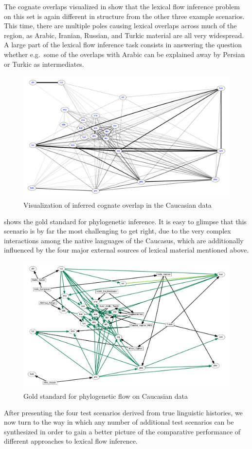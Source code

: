 The cognate overlaps visualized in  show that the lexical flow inference problem on this set is again different in structure from the other three example scenarios. This time, there are multiple poles causing lexical overlaps across much of the region, as Arabic, Iranian, Russian, and Turkic material are all very widespread. A large part of the lexical flow inference task consists in answering the question whether e.g.\ some of the overlaps with Arabic can be explained away by Persian or Turkic as intermediates.

\begin{figure}
 \includegraphics[width=\textwidth]{figures/cognacy-strength-caucasus.pdf}
 \caption{Visualization of inferred cognate overlap in the Caucasian data}
 \label{caucasus-cognacy}
\end{figure}

 shows the gold standard for phylogenetic inference. It is easy to glimpse that this scenario is by far the most challenging to get right, due to the very complex interactions among the native languages of the Caucasus, which are additionally influenced by the four major external sources of lexical material mentioned above. 

\begin{figure}
  \includegraphics[width=\textwidth]{figures/goldstandard-phylo-caucasus.pdf}
  \caption{Gold standard for phylogenetic flow on Caucasian data} 
  \label{caucasus-goldstandard-phylo} 
\end{figure} 

After presenting the four test scenarios derived from true linguistic histories, we now turn to the way in which any number of additional test scenarios can be synthesized in order to gain a better picture of the comparative performance of different approaches to lexical flow inference.
